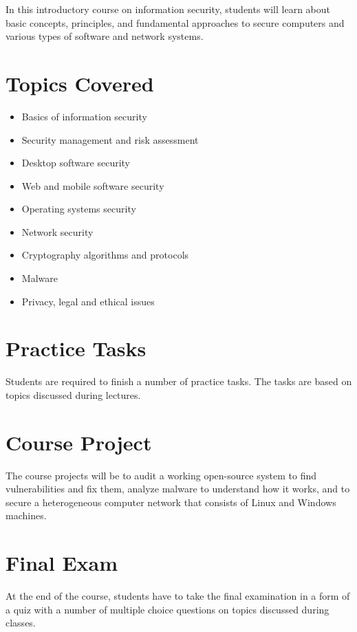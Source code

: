 \documentclass[12pt,a4paper,oneside]{article}
\begin{document}
	In this introductory course on information security, students will learn about basic concepts, principles, and fundamental approaches to secure computers and various types of software and network systems.

    \section{Topics Covered}

        \begin{itemize}
        	\item Basics of information security
            \item Security management and risk assessment
            \item Desktop software security
            \item Web and mobile software security
            \item Operating systems security
            \item Network security
            \item Cryptography algorithms and protocols 
            \item Malware
            \item Privacy, legal and ethical issues
        \end{itemize}

    \section{Practice Tasks}

        Students are required to finish a number of practice tasks. The tasks are based
        on topics discussed during lectures.

    \section{Course Project}

        The course projects will be to audit a working open-source system to find vulnerabilities and fix them, analyze malware to understand how it works, and to secure a heterogeneous computer network that consists of Linux and Windows machines. 

    \section{Final Exam}

        At the end of the course, students have to take the final examination in
        a form of a quiz with a number of multiple choice questions on topics
        discussed during classes.
\end{document}
